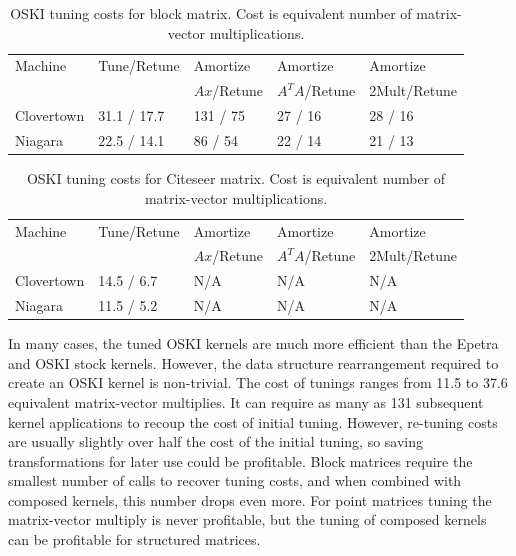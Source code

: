 \begin{table}[htbp]
\begin{center}
\begin{tabular}{|l|l|l|l|l|}
\hline
Machine & Tune/Retune & Amortize & Amortize & Amortize \\
 & & $Ax$/Retune & $A^TA$/Retune & 2Mult/Retune \\
\hline
Clovertown & 31.1 / 17.7 & 131 / 75  & 27 / 16 &  28 / 16  \\
Niagara & 22.5 / 14.1 & 86 / 54 & 22 / 14  & 21 / 13 \\
\hline
\end{tabular}
\caption{OSKI tuning costs for block matrix. Cost is equivalent number of matrix-vector multiplications.}
\label{IK:fig:tuningcostsblock}
\end{center}
\end{table}


\begin{table}[htbp]
\begin{center}
\begin{tabular}{|l|l|l|l|l|}
\hline
Machine & Tune/Retune & Amortize & Amortize & Amortize \\
 & & $Ax$/Retune & $A^TA$/Retune & 2Mult/Retune \\
\hline
Clovertown & 14.5 / 6.7 & N/A & N/A & N/A \\
Niagara & 11.5 / 5.2 & N/A & N/A & N/A \\
\hline
\end{tabular}
\caption{OSKI tuning costs for Citeseer matrix. Cost is equivalent number of matrix-vector multiplications.}
\label{IK:fig:tuningcostsciteseer}
\end{center}
\end{table}

In many cases, the tuned OSKI kernels are much more efficient than the Epetra and
OSKI stock kernels.
However, the data structure rearrangement required to create an OSKI
kernel is non-trivial. The cost of tunings ranges from 11.5 to 37.6 equivalent matrix-vector multiplies.
It can require as many as 131 subsequent kernel applications to recoup the cost of initial tuning.
However, re-tuning costs are usually slightly over half the cost
of the initial tuning, so saving transformations for later use could be profitable.  Block
matrices require the smallest number of calls to recover tuning costs, and when combined with
composed kernels, this number drops even more.
For point matrices tuning the matrix-vector
multiply is never profitable, but the tuning of composed kernels can be profitable 
for structured matrices.

